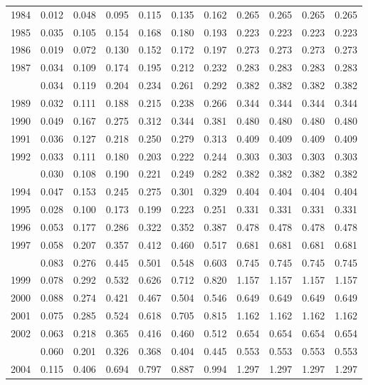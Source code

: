 \documentclass[
]{article}
\begin{document}
\begin{longtable}[t]{lrrrrrrrrrr}
1984 & 0.012 & 0.048 & 0.095 & 0.115 & 0.135 & 0.162 & 0.265 & 0.265 & 0.265 & 0.265\\
1985 & 0.035 & 0.105 & 0.154 & 0.168 & 0.180 & 0.193 & 0.223 & 0.223 & 0.223 & 0.223\\
1986 & 0.019 & 0.072 & 0.130 & 0.152 & 0.172 & 0.197 & 0.273 & 0.273 & 0.273 & 0.273\\
1987 & 0.034 & 0.109 & 0.174 & 0.195 & 0.212 & 0.232 & 0.283 & 0.283 & 0.283 & 0.283\\
\addlinespace
1988 & 0.034 & 0.119 & 0.204 & 0.234 & 0.261 & 0.292 & 0.382 & 0.382 & 0.382 & 0.382\\
1989 & 0.032 & 0.111 & 0.188 & 0.215 & 0.238 & 0.266 & 0.344 & 0.344 & 0.344 & 0.344\\
1990 & 0.049 & 0.167 & 0.275 & 0.312 & 0.344 & 0.381 & 0.480 & 0.480 & 0.480 & 0.480\\
1991 & 0.036 & 0.127 & 0.218 & 0.250 & 0.279 & 0.313 & 0.409 & 0.409 & 0.409 & 0.409\\
1992 & 0.033 & 0.111 & 0.180 & 0.203 & 0.222 & 0.244 & 0.303 & 0.303 & 0.303 & 0.303\\
\addlinespace
1993 & 0.030 & 0.108 & 0.190 & 0.221 & 0.249 & 0.282 & 0.382 & 0.382 & 0.382 & 0.382\\
1994 & 0.047 & 0.153 & 0.245 & 0.275 & 0.301 & 0.329 & 0.404 & 0.404 & 0.404 & 0.404\\
1995 & 0.028 & 0.100 & 0.173 & 0.199 & 0.223 & 0.251 & 0.331 & 0.331 & 0.331 & 0.331\\
1996 & 0.053 & 0.177 & 0.286 & 0.322 & 0.352 & 0.387 & 0.478 & 0.478 & 0.478 & 0.478\\
1997 & 0.058 & 0.207 & 0.357 & 0.412 & 0.460 & 0.517 & 0.681 & 0.681 & 0.681 & 0.681\\
\addlinespace
1998 & 0.083 & 0.276 & 0.445 & 0.501 & 0.548 & 0.603 & 0.745 & 0.745 & 0.745 & 0.745\\
1999 & 0.078 & 0.292 & 0.532 & 0.626 & 0.712 & 0.820 & 1.157 & 1.157 & 1.157 & 1.157\\
2000 & 0.088 & 0.274 & 0.421 & 0.467 & 0.504 & 0.546 & 0.649 & 0.649 & 0.649 & 0.649\\
2001 & 0.075 & 0.285 & 0.524 & 0.618 & 0.705 & 0.815 & 1.162 & 1.162 & 1.162 & 1.162\\
2002 & 0.063 & 0.218 & 0.365 & 0.416 & 0.460 & 0.512 & 0.654 & 0.654 & 0.654 & 0.654\\
\addlinespace
2003 & 0.060 & 0.201 & 0.326 & 0.368 & 0.404 & 0.445 & 0.553 & 0.553 & 0.553 & 0.553\\
2004 & 0.115 & 0.406 & 0.694 & 0.797 & 0.887 & 0.994 & 1.297 & 1.297 & 1.297 & 1.297\\

\end{longtable}
\end{document}
